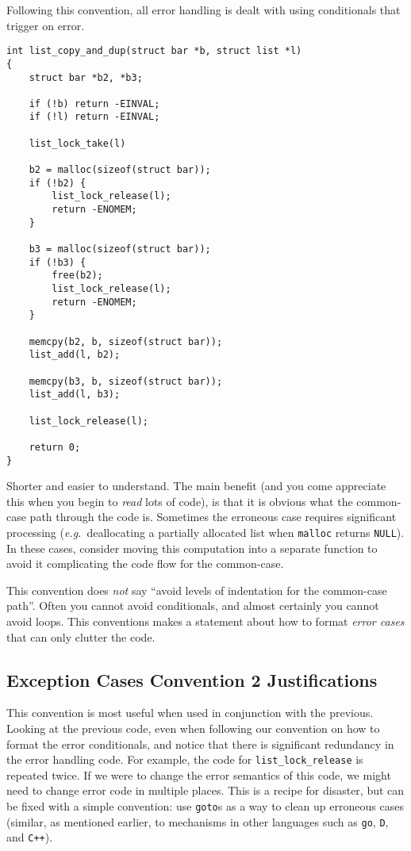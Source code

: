 \documentclass[11pt,onecolumn]{article}
\def\eg{\textit{e.g.}}
\begin{document}
Following this convention, all error handling is dealt with using
conditionals that trigger on error.

    \begin{minipage}{3in}
      \footnotesize
      \lstset{language=C}
      \begin{lstlisting}
int list_copy_and_dup(struct bar *b, struct list *l) 
{
    struct bar *b2, *b3;

    if (!b) return -EINVAL;
    if (!l) return -EINVAL;

    list_lock_take(l)

    b2 = malloc(sizeof(struct bar));
    if (!b2) {
        list_lock_release(l);
        return -ENOMEM;
    }

    b3 = malloc(sizeof(struct bar));
    if (!b3) {
        free(b2);
        list_lock_release(l);
        return -ENOMEM;
    }

    memcpy(b2, b, sizeof(struct bar));
    list_add(l, b2);

    memcpy(b3, b, sizeof(struct bar));
    list_add(l, b3);
    
    list_lock_release(l);

    return 0;
}        
      \end{lstlisting}
    \end{minipage}

Shorter and easier to understand.  The main benefit (and you come
appreciate this when you begin to {\em read} lots of code), is that it
is obvious what the common-case path through the code is.  Sometimes
the erroneous case requires significant processing (\eg\ deallocating
a partially allocated list when {\tt malloc} returns {\tt NULL}).  In
these cases, consider moving this computation into a separate function
to avoid it complicating the code flow for the common-case.

This convention does {\em not} say ``avoid levels of indentation for
the common-case path''.  Often you cannot avoid conditionals, and
almost certainly you cannot avoid loops.  This conventions makes a
statement about how to format {\em error cases} that can only clutter
the code.

\subsection{Exception Cases Convention 2 Justifications}

This convention is most useful when used in conjunction with the
previous.  Looking at the previous code, even when following our
convention on how to format the error conditionals, and notice that
there is significant redundancy in the error handling code.  For
example, the code for {\tt list\_lock\_release} is repeated twice.  If
we were to change the error semantics of this code, we might need to
change error code in multiple places.  This is a recipe for disaster,
but can be fixed with a simple convention: use {\tt goto}s as a way to
clean up erroneous cases (similar, as mentioned earlier, to mechanisms
in other languages such as {\tt go}, {\tt D}, and {\tt C++}).
\end{document}
